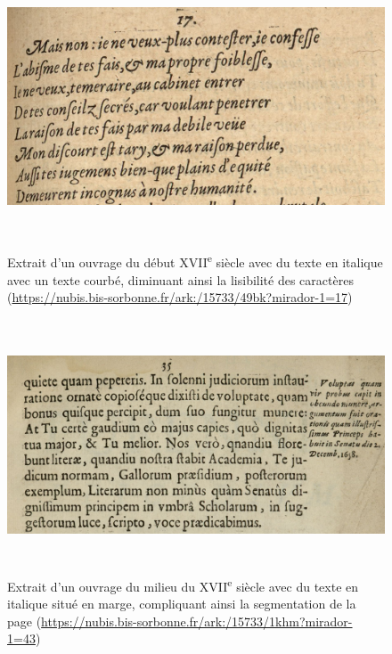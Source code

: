 \documentclass[a4paper,12pt,twoside]{book}
\begin{document}
\begin{figure}
	\includegraphics[width=6.26806in,height=3.27778in]{vertopal_157ae480aa4a4b07be198b586a812241/media/image7.png}
	\caption{Extrait d'un ouvrage du début XVII\textsuperscript{e}
		siècle avec du texte en italique avec un texte courbé, diminuant ainsi
		la lisibilité des caractères
		(\url{https://nubis.bis-sorbonne.fr/ark:/15733/49bk?mirador-1=17})}
\end{figure}



\begin{figure} [H]
	\includegraphics[width=6.26806in,height=2.94444in]{vertopal_157ae480aa4a4b07be198b586a812241/media/image8.png}
	\caption{Extrait d'un ouvrage du milieu du XVII\textsuperscript{e}
		siècle avec du texte en italique situé en marge, compliquant ainsi la
		segmentation de la page
		(\url{https://nubis.bis-sorbonne.fr/ark:/15733/1khm?mirador-1=43})}
\end{figure}
\end{document}
